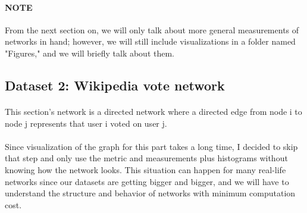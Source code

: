 \documentclass[letterpaper, 11pt]{article}
\newcommand{\1}{\mathds{1}}	%
\theoremstyle{definition}
\begin{document}
\paragraph{NOTE}From the next section on, we will only talk about more general measurements of networks in hand; however, we will still include visualizations in a folder named "Figures," and we will briefly talk about them.
\newpage
\subsection*{Dataset 2: Wikipedia vote network}
\paragraph{}This section's network is a directed network where a directed edge from node i to node j represents that user i voted on user j.
\paragraph{}Since visualization of the graph for this part takes a long time, I decided to skip that step and only use the metric and measurements plus histograms without knowing how the network looks. This situation can happen for many real-life networks since our datasets are getting bigger and bigger, and we will have to understand the structure and behavior of networks with minimum computation cost.
\end{document}
